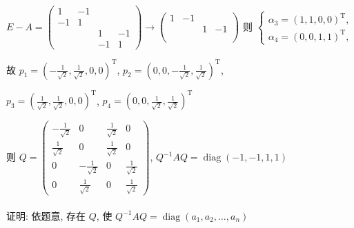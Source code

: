 \begin{enumerate}
			       \( E-A = \begin{pmatrix}
				       1  & -1 &    &    \\
				       -1 & 1  &    &    \\
				          &    & 1  & -1 \\
				          &    & -1 & 1
			       \end{pmatrix} \rightarrow \begin{pmatrix}
				       1 & -1 &   &    \\
				         &    & 1 & -1 \\
				         &    &   &    \\
				         &    &   &
			       \end{pmatrix} \) 则 \( \begin{cases} \alpha_{3} = (1, 1, 0, 0)^{\mathrm{T}}, \\ \alpha_{4} = (0, 0, 1, 1)^{\mathrm{T}}, \end{cases} \)

			       故 \( p_{1} = \left( -\frac{1}{\sqrt{2}}, \frac{1}{\sqrt{2}}, 0, 0 \right)^{\mathrm{T}} \), \( p_{2} = \left( 0, 0, -\frac{1}{\sqrt{2}}, \frac{1}{\sqrt{2}} \right)^{\mathrm{T}} \),

			       \( p_{3} = \left( \frac{1}{\sqrt{2}}, \frac{1}{\sqrt{2}}, 0, 0 \right)^{\mathrm{T}} \), \( p_{4} = \left( 0, 0, \frac{1}{\sqrt{2}}, \frac{1}{\sqrt{2}} \right)^{\mathrm{T}} \)

			       则 \( Q = \begin{pmatrix}
				       -\frac{1}{\sqrt{2}} & 0                   & \frac{1}{\sqrt{2}} & 0                  \\
				       \frac{1}{\sqrt{2}}  & 0                   & \frac{1}{\sqrt{2}} & 0                  \\
				       0                   & -\frac{1}{\sqrt{2}} & 0                  & \frac{1}{\sqrt{2}} \\
				       0                   & \frac{1}{\sqrt{2}}  & 0                  & \frac{1}{\sqrt{2}}
			       \end{pmatrix} \), \( Q^{-1}AQ = \operatorname{diag}(-1, -1, 1, 1) \)
		 \end{enumerate}


	 \paragraph{} %
		 证明: 依题意, 存在 \( Q \), 使 \( Q^{-1}AQ = \operatorname{diag}(a_{1}, a_{2}, \dots, a_{n}) \)

